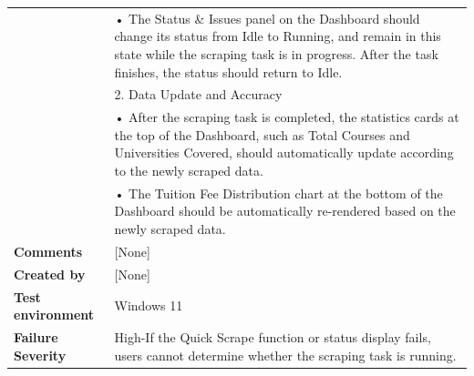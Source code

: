 \begin{table}[h]
\begin{tabularx}{\linewidth}{>{\bfseries}l X}
 &• The Status \& Issues panel on the Dashboard should change its status from Idle to Running, and remain in this state while the scraping task is in progress. After the task finishes, the status should return to Idle.\\
&2. Data Update and Accuracy\\
 &• After the scraping task is completed, the statistics cards at the top of the Dashboard, such as Total Courses and Universities Covered, should automatically update according to the newly scraped data.\\
 &• The Tuition Fee Distribution chart at the bottom of the Dashboard should be automatically re-rendered based on the newly scraped data. \\ \hline
Comments & [None]\\ \hline
Created by & [None] \\ \hline
Test environment & Windows 11 \\ \hline
Failure Severity & High-If the Quick Scrape function or status display fails, users cannot determine whether the scraping task is running.\\ \hline
\end{tabularx}
\end{table}

